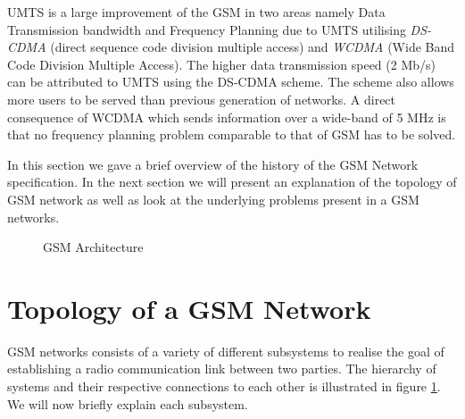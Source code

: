 UMTS is a large improvement of the GSM in two areas namely Data Transmission bandwidth and Frequency Planning due to UMTS utilising \emph{DS-CDMA} (direct sequence code division multiple access) and \emph{WCDMA} (Wide Band Code Division Multiple Access). The higher data transmission speed (2 Mb/s) can be attributed to UMTS using the DS-CDMA scheme. The scheme also allows more users to be served than previous generation of networks. A direct consequence of WCDMA which sends information over a wide-band of 5 MHz is that no frequency planning problem comparable to that of GSM has to be solved\cite{tabuglobalplanning3g,Eisenblatter}.

In this section we gave a brief overview of the history of the GSM Network specification. In the next section we will present an explanation of the topology of GSM network as well as look at the 
underlying problems present in a GSM networks.

\begin{figure}[hptb]
	\begin{centering}
		
		\caption{GSM Architecture}
		\label{fig:GSMArchitecture}
	\end{centering}
\end{figure}

\section{Topology of a GSM Network}
GSM networks consists of a variety of different subsystems to realise the goal of establishing a radio communication link between two parties. The hierarchy of systems and their respective connections to
each other is illustrated in figure \ref{fig:GSMArchitecture}. We will now briefly explain each subsystem.
